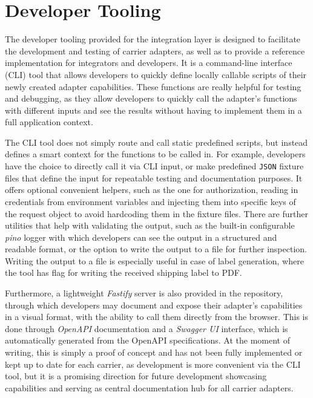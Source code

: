 \documentclass{imc-inf}
\begin{document}
\section{Developer Tooling}
The developer tooling provided for the integration layer is designed to facilitate the development and testing of carrier adapters, as well as to provide a reference implementation for integrators and developers.
It is a command-line interface (CLI) tool that allows developers to quickly define locally callable scripts of their newly created adapter capabilities.
These functions are really helpful for testing and debugging, as they allow developers to quickly call the adapter's functions with different inputs and see the results without having to implement them in a full application context.

The CLI tool does not simply route and call static predefined scripts, but instead defines a smart context for the functions to be called in.
For example, developers have the choice to directly call it via CLI input, or make predefined \texttt{JSON} fixture files that define the input for repeatable testing and documentation purposes.
It offers optional convenient helpers, such as the one for authorization, reading in credentials from environment variables and injecting them into specific keys of the request object to avoid hardcoding them in the fixture files.
There are further utilities that help with validating the output, such as the built-in configurable \textit{pino} logger with which developers can see the output in a structured and readable format, or the option to write the output to a file for further inspection.
Writing the output to a file is especially useful in case of label generation, where the tool has flag for writing the received shipping label to PDF.

Furthermore, a lightweight \textit{Fastify} server is also provided in the repository, through which developers may document and expose their adapter's capabilities in a visual format, with the ability to call them directly from the browser.
This is done through \textit{OpenAPI} documentation and a \textit{Swagger UI} interface, which is automatically generated from the OpenAPI specifications.
At the moment of writing, this is simply a proof of concept and has not been fully implemented or kept up to date for each carrier, as development is more convenient via the CLI tool, but it is a promising direction for future development showcasing capabilities and serving as central documentation hub for all carrier adapters.
\end{document}

